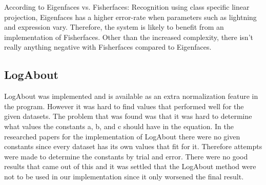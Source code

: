 According to Eigenfaces vs. Fisherfaces: Recognition using class specific linear projection, Eigenfaces has a higher error-rate when parameters such as lightning and expression vary. Therefore, the system is likely to benefit from an implementation of Fisherfaces. Other than the increased complexity, there isn’t really anything negative with Fisherfaces compared to Eigenfaces.


\subsection{LogAbout}
LogAbout was implemented and is available as an extra normalization feature in the program. However it was hard to find values that performed well for the given datasets. The problem that was  found was that it was hard to determine what values the constants a, b, and c should have in the equation. In the researched papers for the implementation of LogAbout there were no given constants since every dataset has its own values that fit for it.  Therefore attempts were made to determine the constants by trial and error. There were no good results that came out of this and it was settled that the LogAbout method were not to be used in our implementation since it only worsened the final result.
